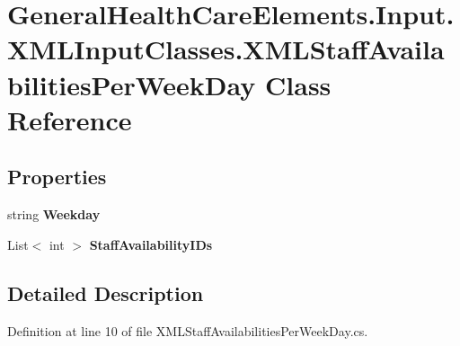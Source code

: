\hypertarget{class_general_health_care_elements_1_1_input_1_1_x_m_l_input_classes_1_1_x_m_l_staff_availabilities_per_week_day}{}\section{General\+Health\+Care\+Elements.\+Input.\+X\+M\+L\+Input\+Classes.\+X\+M\+L\+Staff\+Availabilities\+Per\+Week\+Day Class Reference}
\label{class_general_health_care_elements_1_1_input_1_1_x_m_l_input_classes_1_1_x_m_l_staff_availabilities_per_week_day}
\subsection*{Properties}
\begin{DoxyCompactItemize}
\item 
string {\bfseries Weekday}\hypertarget{class_general_health_care_elements_1_1_input_1_1_x_m_l_input_classes_1_1_x_m_l_staff_availabilities_per_week_day_a394fc67e7cfa630626766059b430d209}{}\label{class_general_health_care_elements_1_1_input_1_1_x_m_l_input_classes_1_1_x_m_l_staff_availabilities_per_week_day_a394fc67e7cfa630626766059b430d209}

\item 
List$<$ int $>$ {\bfseries Staff\+Availability\+I\+Ds}\hypertarget{class_general_health_care_elements_1_1_input_1_1_x_m_l_input_classes_1_1_x_m_l_staff_availabilities_per_week_day_a2ed4a93c2158c3e35861523312759473}{}\label{class_general_health_care_elements_1_1_input_1_1_x_m_l_input_classes_1_1_x_m_l_staff_availabilities_per_week_day_a2ed4a93c2158c3e35861523312759473}

\end{DoxyCompactItemize}


\subsection{Detailed Description}


Definition at line 10 of file X\+M\+L\+Staff\+Availabilities\+Per\+Week\+Day.\+cs.

